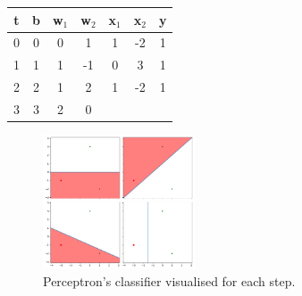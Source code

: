 \begin{solution}
  \begin{center}
		\begin{tabular}{ |c|c|c|c|c|c|c| } 
			\hline
			t & b & w$_1$ & w$_2$  & x$_1$ &  x$_2$ & y \\ 
			\hline
			0 & 0 & 0 & 1 & 1 & -2 & 1\\ 
			1 & 1 & 1 & -1 & 0 & 3 & 1\\
			2 & 2 & 1 & 2 & 1 & -2 & 1\\
			3 & 3 & 2 & 0 & & &  \\
			\hline
		\end{tabular}
	\end{center}

  \begin{figure}[H]
    \centering
    \includegraphics[width=0.4\textwidth]{separable_PLA.pdf}
    \caption{Perceptron's classifier visualised for each step.}
  \end{figure}
\end{solution}

